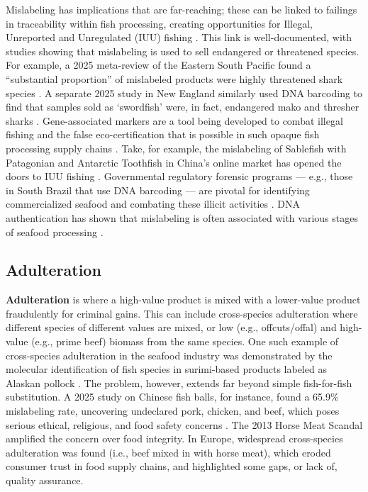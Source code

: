 Mislabeling has implications that are far-reaching; these can be linked to failings in traceability within fish processing, creating opportunities for Illegal, Unreported and Unregulated (IUU) fishing \citep{Helyar2014}. This link is well-documented, with studies showing that mislabeling is used to sell endangered or threatened species. For example, a 2025 meta-review of the Eastern South Pacific found a ``substantial proportion'' of mislabeled products were highly threatened shark species \citep{Marin2025}. A separate 2025 study in New England similarly used DNA barcoding to find that samples sold as `swordfish' were, in fact, endangered mako and thresher sharks \citep{Eppley2025}.
Gene-associated markers are a tool being developed to combat illegal fishing and the false eco-certification that is possible in such opaque fish processing supply chains \citep{Nielsen2012}.
Take, for example, the mislabeling of Sablefish with Patagonian and Antarctic Toothfish in China's online market has opened the doors to IUU fishing \citep{Xiong2016}.
Governmental regulatory forensic programs --- e.g., those in South Brazil that use DNA barcoding --- are pivotal for identifying commercialized seafood and combating these illicit activities \citep{Carvalho2015}.
DNA authentication has shown that mislabeling is often associated with various stages of seafood processing \citep{Munoz2016}.

\subsection{Adulteration}

\textbf{Adulteration} is where a high-value product is mixed with a lower-value product fraudulently for criminal gains. This can include cross-species adulteration where different species of different values are mixed, or low (e.g., offcuts/offal) and high-value (e.g., prime beef) biomass from the same species.
One such example of cross-species adulteration in the seafood industry was demonstrated by the molecular identification of fish species in surimi-based products labeled as Alaskan pollock \citep{Keskin2012}. The problem, however, extends far beyond simple fish-for-fish substitution. A 2025 study on Chinese fish balls, for instance, found a 65.9\% mislabeling rate, uncovering undeclared pork, chicken, and beef, which poses serious ethical, religious, and food safety concerns \citep{Zhang2025}.
The 2013 Horse Meat Scandal \citep{Premanandh2013} amplified the concern over food integrity. In Europe, widespread cross-species adulteration was found (i.e., beef mixed in with horse meat), which eroded consumer trust in food supply chains, and highlighted some gaps, or lack of, quality assurance.

